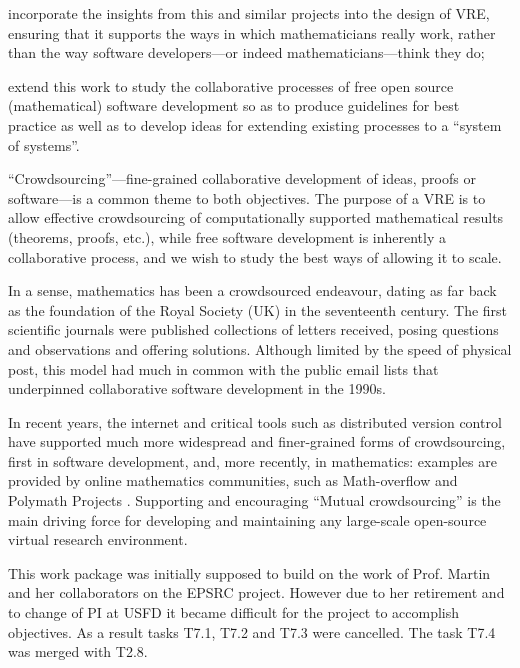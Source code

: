 \begin{workpackage}[id=social-aspects,wphases=0-48,
  title=Social Aspects (canceled),
  lead=UO,
  UORM=6,status=canceled]
\begin{wpobjectives}
\begin{compactitem}
\item incorporate the insights from this and similar projects into the
  design of \TheProject VRE, ensuring that it supports the ways in
  which mathematicians really work, rather than the way software
  developers---or indeed mathematicians---think they do;
\item extend this work to study the collaborative processes of free
  open source (mathematical) software development so as to produce
  guidelines for best practice as well as to develop ideas for extending existing processes
  to a ``system of systems''.
\end{compactitem}
\end{wpobjectives}

\begin{wpdescription}
\color{gray}
``Crowdsourcing''---fine-grained collaborative development of ideas,
  proofs or software---is a common theme to both objectives. The purpose
  of a VRE is to allow effective crowdsourcing of computationally
  supported mathematical results (theorems, proofs, etc.),
  while free software development is inherently a collaborative process,
  and we wish to study the best ways of allowing it to scale.

  In a sense, mathematics has been a crowdsourced endeavour, dating as
  far back as the foundation of the Royal Society (UK) in the seventeenth
  century.  The first scientific journals were published collections
  of letters received, posing questions and observations and offering
  solutions.  Although limited by the speed of physical post, this
  model had much in common with the public email lists that
  underpinned collaborative software development in the 1990s.

  In recent years, the internet and critical tools such as distributed
  version control have supported much more widespread and finer-grained
  forms of crowdsourcing, first in software development, and, more recently,
  in mathematics: examples are provided by online mathematics communities, such as Math-overflow
  \cite{mathoverflow} and Polymath Projects \cite{polymath_SIAM,
  PolymathBlog}.  Supporting and encouraging ``Mutual
  crowdsourcing'' is the main driving force for developing and
  maintaining any large-scale open-source virtual research
  environment.

  This work package was initially supposed to build on the work of Prof. Martin and her collaborators on the EPSRC
  project. However due to her retirement and to change of PI
  at USFD it became difficult for the project to accomplish objectives.
  As a result tasks T7.1, T7.2 and T7.3 were cancelled. The task T7.4 was merged with T2.8.


\end{wpdescription}
\end{workpackage}
